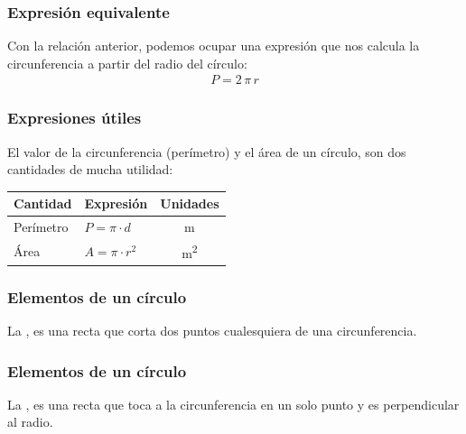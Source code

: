 \documentclass[14pt]{beamer}
\begin{document}
\begin{frame}
\frametitle{Expresión equivalente}
Con la relación anterior, podemos ocupar una expresión que nos calcula la circunferencia a partir del radio del círculo:
\pause
\begin{align*}
P = 2 \, \pi \, r
\end{align*}
\end{frame}
\begin{frame}
\frametitle{Expresiones útiles}
El valor de la circunferencia (perímetro) y el área de un círculo, son dos cantidades de mucha utilidad:
\pause
\begin{table}
\centering
\begin{tabular}{l | l | c}
Cantidad & Expresión & Unidades \\ \hline
Perímetro & $P = \pi \cdot d$ & \unit{\meter} \\ \hline
Área & $A = \pi \cdot r^{2}$ & \unit{\square\meter}
\end{tabular}
\end{table}
\end{frame}
\begin{frame}
\frametitle{Elementos de un círculo}
La , es una recta que corta dos puntos cualesquiera de una circunferencia.
\pause
\begin{figure}
    \centering
\end{figure}
\end{frame}
\begin{frame}
\frametitle{Elementos de un círculo}
La , es una recta que toca a la circunferencia en un solo punto y es perpendicular al radio.
\pause
\begin{figure}
    \centering
\end{figure}
\end{frame}
\end{document}
